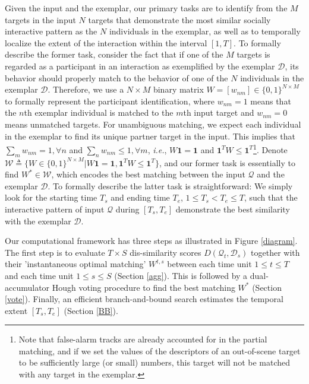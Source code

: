 Given the input and the exemplar, our primary tasks are to identify from the $M$ targets in the input $N$ targets that demonstrate the most similar socially interactive pattern as the $N$ individuals in the exemplar, as well as to temporally localize the extent of the interaction within the interval $[1, T]$. To formally describe the former task, consider the fact that if one of the $M$ targets is regarded as a participant in an interaction as exemplified by the exemplar $\mathcal{D}$, its behavior should properly match to the behavior of one of the $N$ individuals in the exemplar $\mathcal{D}$. Therefore, we use a $N\times M$ binary matrix $W=[w_{nm}]\in\{0,1\}^{N\times M}$ to formally represent the participant identification, where $w_{nm}=1$ means that the $n$th exemplar individual is matched to the $m$th input target and $w_{nm}=0$ means unmatched targets. For unambiguous matching, we expect each individual in the exemplar to find its unique partner target in the input. This implies that $\sum_{m}w_{nm}=1, \forall n$ and $\sum_{n}w_{nm}\leq 1, \forall m$, \textit{i.e.}, $W\mathbf{1}=\mathbf{1}$ and $\mathbf{1}^{T}W\leq\mathbf{1}^{T}$\footnote{Note that false-alarm tracks are already accounted for in the partial matching, and if we set the values of the descriptors of an out-of-scene target to be sufficiently large (or small) numbers, this target will not be matched with any target in the exemplar.}. Denote $\mathcal{W}\triangleq\{W\in\{0,1\}^{N\times M}| W\mathbf{1}=\mathbf{1}, \mathbf{1}^{T}W\leq\mathbf{1}^{T}\}$, and our former task is essentially to find $W^{*}\in\mathcal{W}$, which encodes the best matching between the input $\mathcal{Q}$ and the exemplar $\mathcal{D}$. To formally describe the latter task is straightforward: We simply look for the starting time $T_{s}$ and ending time $T_{e}$, $1\le T_{s}<T_{e}\le T$, such that the interactive pattern of input $\mathcal{Q}$ during $[T_{s}, T_{e}]$ demonstrate the best similarity with the exemplar $\mathcal{D}$.

Our computational framework has three steps as illustrated in Figure \ref{diagram}. The first step is to evaluate $T\times S$ dis-similarity scores $D(\mathcal{Q}_{t}, \mathcal{D}_{s})$ together with their 'instantaneous optimal matching' $W^{t,s}$ between each time unit  $1\le t\le T$ and each time unit  $1\le s\le S$ (Section \ref{agg}). This is followed by a dual-accumulator Hough voting procedure to find the best matching $W^{*}$ (Section \ref{vote}). Finally, an efficient branch-and-bound search estimates the temporal extent $[T_{s}, T_{e}]$ (Section \ref{BB}).  